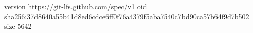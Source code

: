 version https://git-lfs.github.com/spec/v1
oid sha256:37d8640a55b41d8ed6cdce6ff0f76a4379f5aba7540c7bd90ca57b64f9d7b502
size 5642
